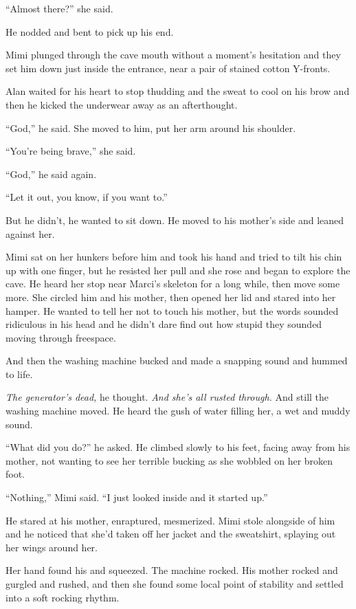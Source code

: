 ``Almost there?'' she said.

He nodded and bent to pick up his end.

Mimi plunged through the cave mouth without a moment's hesitation and
they set him down just inside the entrance, near a pair of stained
cotton Y-fronts.

Alan waited for his heart to stop thudding and the sweat to cool on
his brow and then he kicked the underwear away as an afterthought.

``God,'' he said.  She moved to him, put her arm around his shoulder.

``You're being brave,'' she said.

``God,'' he said again.

``Let it out, you know, if you want to.''

But he didn't, he wanted to sit down.  He moved to his mother's side
and leaned against her.

Mimi sat on her hunkers before him and took his hand and tried to tilt
his chin up with one finger, but he resisted her pull and she rose and
began to explore the cave.  He heard her stop near Marci's skeleton
for a long while, then move some more.  She circled him and his
mother, then opened her lid and stared into her hamper.  He wanted to
tell her not to touch his mother, but the words sounded ridiculous in
his head and he didn't dare find out how stupid they sounded moving
through freespace.

And then the washing machine bucked and made a snapping sound and
hummed to life.

\textit{The generator's dead,} he thought.  \textit{And she's all
rusted through.} And still the washing machine moved.  He heard the
gush of water filling her, a wet and muddy sound.

``What did you do?'' he asked.  He climbed slowly to his feet, facing
away from his mother, not wanting to see her terrible bucking as she
wobbled on her broken foot.

``Nothing,'' Mimi said.  ``I just looked inside and it started up.''

He stared at his mother, enraptured, mesmerized.  Mimi stole alongside
of him and he noticed that she'd taken off her jacket and the
sweatshirt, splaying out her wings around her.

Her hand found his and squeezed.  The machine rocked.  His mother
rocked and gurgled and rushed, and then she found some local point of
stability and settled into a soft rocking rhythm.

